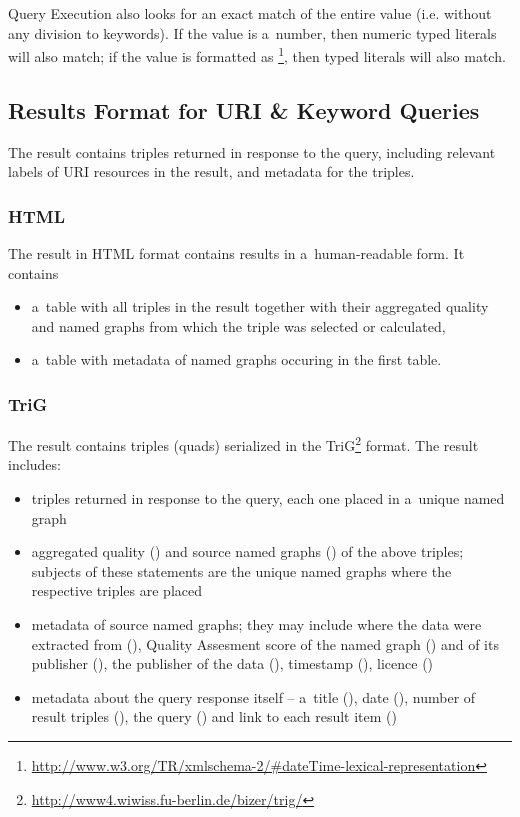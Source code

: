 Query Execution also looks for an exact match of the entire  value (i.e. without any division to keywords). If the  value is a~number, then numeric typed literals will also match; if the  value is formatted as \footnote{\url{http://www.w3.org/TR/xmlschema-2/\#dateTime-lexical-representation}}, then  typed literals will also match.

\subsection{Results Format for URI \& Keyword Queries}
The result contains triples returned in response to the query, including relevant labels of URI resources in the result, and metadata for the triples.

\subsubsection{HTML}

The result in HTML format contains results in a~human-readable form. It contains

\begin{itemize}
	\item a~table with all triples in the result together with their aggregated quality and named graphs from which the triple was selected or calculated,
  \item  a~table with metadata of named graphs occuring in the first table.
\end{itemize}

\subsubsection{TriG}

The result contains triples (quads) serialized in the TriG\footnote{\url{http://www4.wiwiss.fu-berlin.de/bizer/trig/}} format. The result includes:

\begin{itemize}
	\item triples returned in response to the query, each one placed in a~unique named graph
  \item aggregated quality () and source named graphs () of the above triples; subjects of these statements are the unique named graphs where the respective triples are placed
  \item  metadata of source named graphs; they may include where the data were extracted from (), Quality Assesment score of the named graph () and of its publisher (), the publisher of the data (), timestamp (), licence ()
  \item  metadata about the query response itself -- a~title (), date (), number of result triples (), the query () and link to each result item ()
\end{itemize}

